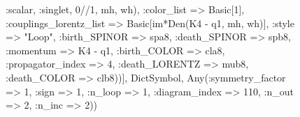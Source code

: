 \documentclass{revtex4}
\begin{document}
\begin{figure}[!htb]
\begin{center}
{:scalar, :singlet, 0//1, mh, wh), :color_list => Basic[1], :couplings_lorentz_list => Basic[im*Den(K4 - q1, mh, wh)], :style => "Loop", :birth_SPINOR => spa8, :death_SPINOR => spb8, :momentum => K4 - q1, :birth_COLOR => cla8, :propagator_index => 4, :death_LORENTZ => mub8, :death_COLOR => clb8))], Dict{Symbol, Any}(:symmetry_factor => 1, :sign => 1, :n_loop => 1, :diagram_index => 110, :n_out => 2, :n_inc => 2)) 
}
\end{center}
\end{figure}
\end{document}
